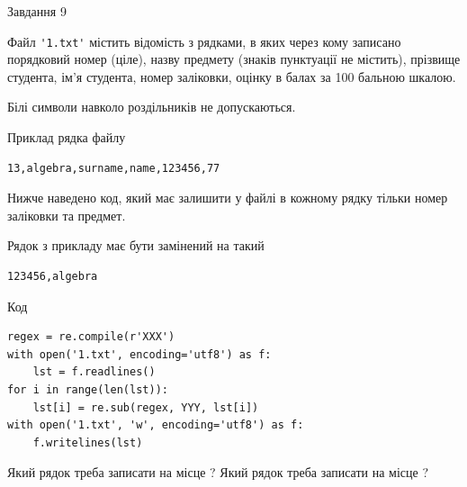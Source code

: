 \documentclass[12pt, ukrainian]{article}
\def\code#1{\Verb!#1!}
\begin{document}
{\begin{minipage}[t]{8.0cm}
\end{minipage}

               
{\begin{center}Завдання {9}\end{center}}
\vspace{-4mm}
Файл \code{'1.txt'} містить відомість з рядками, в яких через кому записано поряд\-ковий номер (ціле), назву предмету (знаків пунктуації не містить), прізвище студента, ім'я студента, номер заліковки, оцінку в балах за 100 бальною шкалою.

Білі символи навколо роздільників не допускаються.

Приклад рядка файлу



\begin{verbatim}
13,algebra,surname,name,123456,77
\end{verbatim}


Нижче наведено код, який має залишити у файлі в кожному рядку тільки номер заліковки та предмет.

Рядок з прикладу має бути замінений на такий



\begin{verbatim}
123456,algebra
\end{verbatim}




Код



\begin{verbatim}
regex = re.compile(r'XXX')
with open('1.txt', encoding='utf8') as f:
    lst = f.readlines()
for i in range(len(lst)):
    lst[i] = re.sub(regex, YYY, lst[i])
with open('1.txt', 'w', encoding='utf8') as f:
    f.writelines(lst)
\end{verbatim}







Який рядок треба записати на місце  ?
Який рядок треба записати на місце  ?\par

}
\newpage
\end{document}
